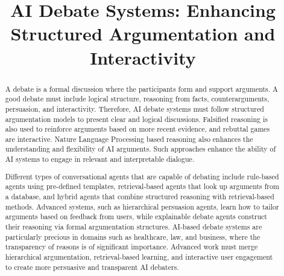 \documentclass[conference]{IEEEtran}
\begin{document}
\title{AI Debate Systems: Enhancing Structured Argumentation and Interactivity}

\author{
\and
{}
\and
{}
\and
{}
}

\maketitle

\begin{abstract}
A debate is a formal discussion where the participants form and support arguments. A good debate must include logical structure, reasoning from facts, counterarguments, persuasion, and interactivity. Therefore, AI debate systems must follow structured argumentation models to present clear and logical discussions. Falsified reasoning is also used to reinforce arguments based on more recent evidence, and rebuttal games are interactive. Nature Language Processing based reasoning also enhances the understanding and flexibility of AI arguments. Such approaches enhance the ability of AI systems to engage in relevant and interpretable dialogue.

Different types of conversational agents that are capable of debating include rule-based agents using pre-defined templates, retrieval-based agents that look up arguments from a database, and hybrid agents that combine structured reasoning with retrieval-based methods. Advanced systems, such as hierarchical persuasion agents, learn how to tailor arguments based on feedback from users, while explainable debate agents construct their reasoning via formal argumentation structures. AI-based debate systems are particularly precious in domains such as healthcare, law, and business, where the transparency of reasons is of significant importance. Advanced work must merge hierarchical argumentation, retrieval-based learning, and interactive user engagement to create more persuasive and transparent AI debaters.
\end{abstract}
\end{document}
